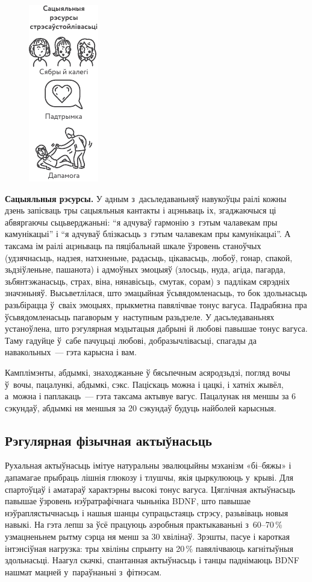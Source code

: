 \begin{figure}[htb!]
  \centering
  \includegraphics[scale=1.5]{willpower/ch7/20.pdf}
\end{figure}

\textbf{Сацыяльныя рэсурсы.} У адным з~дасьледаваньняў навукоўцы раілі кожны дзень запісваць тры сацыяльныя кантакты і ацэньваць іх, згаджаючыся ці абвяргаючы сьцьверджаньні: ``я адчуваў гармонію з~гэтым чалавекам пры камунікацыі'' і ``я адчуваў блізкасьць з~гэтым чалавекам пры камунікацыі''. А таксама ім раілі ацэньваць па пяцібальнай шкале ўзровень станоўчых (удзячнасьць, надзея, натхненьне, радасьць, цікавасьць, любоў, гонар, спакой, зьдзіўленьне, пашанота) і адмоўных эмоцыяў (злосьць, нуда, агіда, пагарда, зьбянтэжанасьць, страх, віна, нянавісьць, смутак, сорам) з~падлікам сярэдніх значэньняў. Высьветлілася, што эмацыйная ўсьвядомленасьць, то бок здольнасьць разьбірацца ў~сваіх эмоцыях, прыкметна павялічвае тонус вагуса. Падрабязна пра ўсьвядомленасьць пагаворым у~наступным разьдзеле. У дасьледаваньнях устаноўлена, што рэгулярная мэдытацыя дабрыні й любові павышае тонус вагуса. Таму гадуйце ў~сабе пачуцьці любові, добразычлівасьці, спагады да навакольных~--- гэта карысна і вам.

Камплімэнты, абдымкі, знаходжаньне ў бясьпечным асяродзьдзі, погляд вочы ў~вочы, пацалункі, абдымкі, сэкс. Паціскаць можна і цацкі, і хатніх жывёл, а~можна і паплакаць~--- гэта таксама актывуе вагус. Пацалунак ня меншы за 6 сэкундаў, абдымкі ня меншыя за 20 сэкундаў будуць найболей карысныя.

\subsection*{Рэгулярная фізычная актыўнасьць}

Рухальная актыўнасьць імітуе натуральны эвалюцыйны мэханізм «бі--бяжы» і дапамагае прыбраць лішнія глюкозу і тлушчы, якія цыркулююць у~крыві. Для спартоўцаў і аматараў характэрны высокі тонус вагуса. Цяглічная актыўнасьць павышае ўзровень нэўратрафічнага чыньніка BDNF, што павышае нэўраплястычнасьць і нашыя шанцы супрацьстаяць стрэсу, разьвіваць новыя навыкі. На гэта лепш за ўсё працуюць аэробныя практыкаваньні з~60--70\,\% узмацненьнем рытму сэрца ня менш за 30 хвілінаў. Зрэшты, пасуе і кароткая інтэнсіўная нагрузка: тры хвіліны спрынту на 20\,\% павялічваюць кагнітыўныя здольнасьці. Наагул скачкі, спантанная актыўнасьць і танцы паднімаюць BDNF нашмат мацней у~параўнаньні з~фітнэсам.

